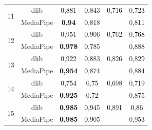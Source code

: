 \begin{table}[]
\begin{tabular}{c | c | c c c c}
\multirow{2}{*}{11} & dlib & \cellcolor[HTML] {1EE100}\textcolor{black}{0,881} & \cellcolor[HTML] {28D700}\textcolor{black}{0,843} & \cellcolor[HTML] {48B700}\textcolor{black}{0,716} & \cellcolor[HTML] {46B900}\textcolor{black}{0,723} \\ & MediaPipe & \cellcolor[HTML] {0FF000}\textcolor{black}{\textbf{0,94}} & \cellcolor[HTML] {2ED100}\textcolor{black}{0,818} & \cellcolor[HTML] {9D6100}\textcolor{white}{0,386} & \cellcolor[HTML] {30CF00}\textcolor{black}{0,811} \\ \hline
\multirow{2}{*}{12} & dlib & \cellcolor[HTML] {0CF300}\textcolor{black}{0,951} & \cellcolor[HTML] {18E700}\textcolor{black}{0,906} & \cellcolor[HTML] {3DC200}\textcolor{black}{0,762} & \cellcolor[HTML] {3BC300}\textcolor{black}{0,768} \\ & MediaPipe & \cellcolor[HTML] {05FA00}\textcolor{black}{\textbf{0,978}} & \cellcolor[HTML] {37C800}\textcolor{black}{0,785} & \cellcolor[HTML] {AF5000}\textcolor{white}{0,313} & \cellcolor[HTML] {1CE300}\textcolor{black}{0,888} \\ \hline
\multirow{2}{*}{13} & dlib & \cellcolor[HTML] {12EC00}\textcolor{black}{0,922} & \cellcolor[HTML] {1DE200}\textcolor{black}{0,883} & \cellcolor[HTML] {2CD300}\textcolor{black}{0,826} & \cellcolor[HTML] {2BD300}\textcolor{black}{0,829} \\ & MediaPipe & \cellcolor[HTML] {0BF300}\textcolor{black}{\textbf{0,954}} & \cellcolor[HTML] {20DF00}\textcolor{black}{0,874} & \cellcolor[HTML] {897600}\textcolor{white}{0,461} & \cellcolor[HTML] {1DE200}\textcolor{black}{0,884} \\ \hline
\multirow{2}{*}{14} & dlib & \cellcolor[HTML] {3FC000}\textcolor{black}{0,754} & \cellcolor[HTML] {3FC000}\textcolor{black}{0,75} & \cellcolor[HTML] {4DB200}\textcolor{black}{0,698} & \cellcolor[HTML] {47B800}\textcolor{black}{0,719} \\ & MediaPipe & \cellcolor[HTML] {12EC00}\textcolor{black}{\textbf{0,925}} & \cellcolor[HTML] {47B800}\textcolor{black}{0,72} & \cellcolor[HTML] {9A6500}\textcolor{white}{0,396} & \cellcolor[HTML] {20DF00}\textcolor{black}{0,875} \\ \hline
\multirow{2}{*}{15} & dlib & \cellcolor[HTML] {02FC00}\textcolor{black}{\textbf{0,985}} & \cellcolor[HTML] {0EF100}\textcolor{black}{0,945} & \cellcolor[HTML] {1BE300}\textcolor{black}{0,891} & \cellcolor[HTML] {22DC00}\textcolor{black}{0,86} \\ & MediaPipe & \cellcolor[HTML] {02FC00}\textcolor{black}{\textbf{0,985}} & \cellcolor[HTML] {18E700}\textcolor{black}{0,905} & \cellcolor[HTML] {966900}\textcolor{white}{0,412} & \cellcolor[HTML] {0CF300}\textcolor{black}{0,953} \\ \hline

\end{tabular}
\end{table}
